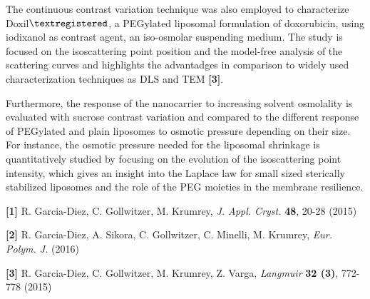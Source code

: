 The continuous contrast variation technique was also employed to characterize Doxil$\textregistered$, a PEGylated liposomal formulation of doxorubicin, using iodixanol as contrast agent, an iso-osmolar suspending medium. The study is focused on the isoscattering point position and the model-free analysis of the scattering curves and highlights the advantadges in comparison to widely used characterization techniques as DLS and TEM \textbf{[3]}. 

Furthermore, the response of the nanocarrier to increasing solvent osmolality is evaluated with sucrose contrast variation and compared to the different response of PEGylated and plain liposomes to osmotic pressure depending on their size. For instance, the osmotic pressure needed for the liposomal shrinkage is quantitatively studied by focusing on the evolution of the isoscattering point intensity, which gives an insight into the Laplace law for small sized sterically stabilized liposomes and the role of the PEG moieties in the membrane resilience.

\bigskip

\footnotesize{

\textbf{[1]} R. Garcia-Diez, C. Gollwitzer, M. Krumrey, \emph{J. Appl. Cryst.} \textbf{48}, 20-28 (2015)

\textbf{[2]} R. Garcia-Diez, A. Sikora, C. Gollwitzer, C. Minelli, M. Krumrey, \emph{Eur. Polym. J.} (2016)

\textbf{[3]} R. Garcia-Diez, C. Gollwitzer, M. Krumrey, Z. Varga, \emph{Langmuir} \textbf{32 (3)}, 772-778 (2015)

}

\normalsize

